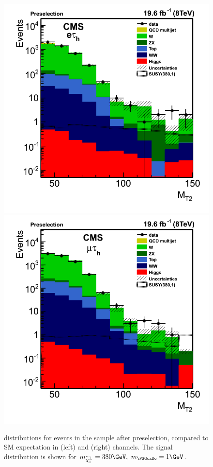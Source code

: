 \begin{figure}[!htb]
\centering
\includegraphics[angle=0,scale=0.375]{SelectionEleTau/MT2_eletau.png}
\includegraphics[angle=0,scale=0.375]{SelectionMuTau/MT2_mutau.png}
\caption{\mttwo  distributions for events in the sample after preselection, compared to SM expectation in (left) \eTau and (right) \muTau channels. The signal distribution is shown for $m_{\chione}=380\GeV,~m_{\PSGczDo}=1\GeV$.}
\label{fig:mt2leptontau}
\end{figure}






